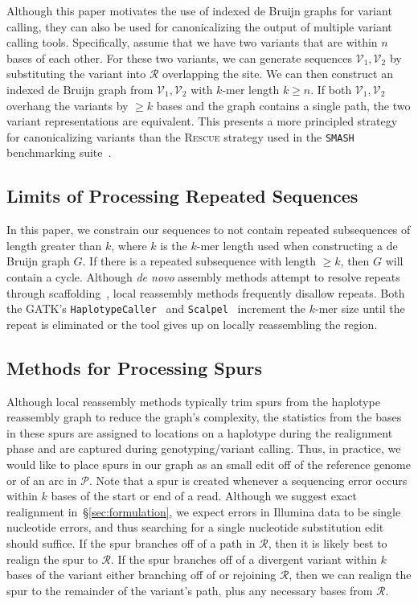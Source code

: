 \documentclass[11pt]{article}
\begin{document}
Although this paper motivates the use of indexed de Bruijn graphs for variant calling, they can also
be used for canonicalizing the output of multiple variant calling tools. Specifically, assume that we have
two variants that are within $n$ bases of each other. For these two variants, we can generate sequences
$\mathcal{V}_1, \mathcal{V}_2$ by substituting the variant into $\mathcal{R}$ overlapping the site. We
can then construct an indexed de Bruijn graph from $\mathcal{V}_1, \mathcal{V}_2$ with $k$-mer length
$k \ge n$. If both $\mathcal{V}_1, \mathcal{V}_2$ overhang the variants by $\ge k$ bases and the graph
contains a single path, the two variant representations are equivalent. This presents a more principled
strategy for canonicalizing variants than the \textsc{Rescue} strategy used in the \texttt{SMASH}
benchmarking suite~\cite{talwalkar14}.

\subsection{Limits of Processing Repeated Sequences}
\label{sec:limits-repeated-sequences}

In this paper, we constrain our sequences to not contain repeated subsequences of length greater than
$k$, where $k$ is the $k$-mer length used when constructing a de Bruijn graph $G$. If there is a repeated 
subsequence with length $\ge k$, then $G$ will contain a cycle. Although \emph{de novo} assembly
methods attempt to resolve repeats through scaffolding~\cite{zerbino09}, local reassembly methods
frequently disallow repeats. Both the GATK's \texttt{HaplotypeCaller}~\cite{depristo11} and
\texttt{Scalpel}~\cite{narzisi14} increment the $k$-mer size until the repeat is eliminated or the tool
gives up on locally reassembling the region.

\subsection{Methods for Processing Spurs}
\label{sec:spurs}

Although local reassembly methods typically trim spurs from the haplotype reassembly graph to reduce
the graph's complexity, the statistics from the bases in these spurs are assigned to locations on a
haplotype during the realignment phase and are captured during genotyping/variant calling. Thus, in
practice, we would like to place spurs in our graph as an small edit off of the reference genome or of an
arc in $\mathcal{P}$. Note that a spur is created whenever a sequencing error occurs within $k$ bases of
the start or end of a read. Although we suggest exact realignment in~\S\ref{sec:formulation}, we expect
errors in Illumina data to be single nucleotide errors, and thus searching for a single nucleotide
substitution edit should suffice. If the spur branches off of a path in $\mathcal{R}$, then it is likely best to
realign the spur to $\mathcal{R}$. If the spur branches off of a divergent variant within $k$ bases of the
variant either branching off of or rejoining $\mathcal{R}$, then we can realign the spur to the remainder of
the variant's path, plus any necessary bases from $\mathcal{R}$.
\end{document}
